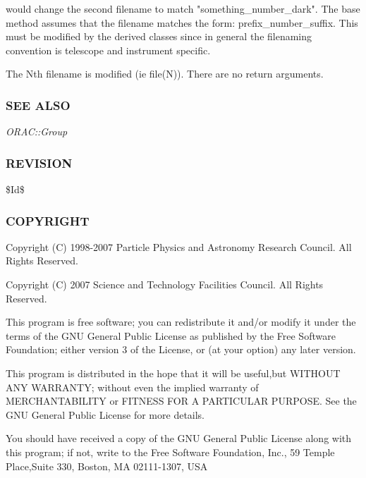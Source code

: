 \begin{description}
\begin{description}
\begin{description}
would change the second filename to match "something\_number\_dark".
The base method assumes that the filename matches the form:
prefix\_number\_suffix. This must be modified by the derived
classes since in general the filenaming convention is telescope
and instrument specific.



The Nth filename is modified (ie file(N)).
There are no return arguments.

\end{description}
\subsubsection*{SEE ALSO\label{ORAC::Frame_SEE_ALSO}}


\emph{ORAC::Group}

\subsubsection*{REVISION\label{ORAC::Frame_REVISION}}


\$Id\$

\subsubsection*{COPYRIGHT\label{ORAC::Frame_COPYRIGHT}}


Copyright (C) 1998-2007 Particle Physics and Astronomy Research
Council. All Rights Reserved.



Copyright (C) 2007 Science and Technology Facilities Council.  All
Rights Reserved.



This program is free software; you can redistribute it and/or modify it under
the terms of the GNU General Public License as published by the Free Software
Foundation; either version 3 of the License, or (at your option) any later
version.



This program is distributed in the hope that it will be useful,but WITHOUT ANY
WARRANTY; without even the implied warranty of MERCHANTABILITY or FITNESS FOR A
PARTICULAR PURPOSE. See the GNU General Public License for more details.



You should have received a copy of the GNU General Public License along with
this program; if not, write to the Free Software Foundation, Inc., 59 Temple
Place,Suite 330, Boston, MA  02111-1307, USA


\end{description}
\end{description}

